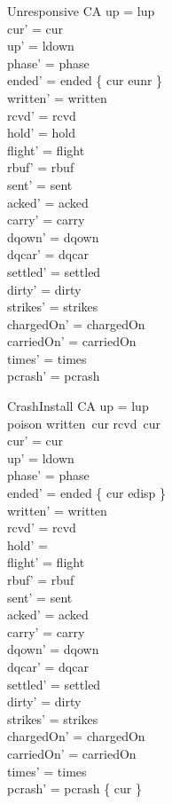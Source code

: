 \documentclass[a4paper,10pt,fleqn]{article}
\begin{document}
\begin{schema}{Unresponsive}
  \Delta CA
\where
  up = lup \\
  cur' = cur \\
  up' = ldown \\
  phase' = phase \\
  ended' = ended \oplus \{ cur \mapsto eunr \} \\
  written' = written \\
  rcvd' = rcvd \\
  hold' = hold \\
  flight' = flight \\
  rbuf' = rbuf \\
  sent' = sent \\
  acked' = acked \\
  carry' = carry \\
  dqown' = dqown \\
  dqcar' = dqcar \\
  settled' = settled \\
  dirty' = dirty \\
  strikes' = strikes \\
  chargedOn' = chargedOn \\
  carriedOn' = carriedOn \\
  times' = times \\
  pcrash' = pcrash
\end{schema}

\begin{schema}{CrashInstall}
  \Delta CA
\where
  up = lup \\
  poison \in written~cur \setminus rcvd~cur \\
  cur' = cur \\
  up' = ldown \\
  phase' = phase \\
  ended' = ended \oplus \{ cur \mapsto edisp \} \\
  written' = written \\
  rcvd' = rcvd \\
  hold' = \emptyset \\
  flight' = flight \\
  rbuf' = rbuf \\
  sent' = sent \\
  acked' = acked \\
  carry' = carry \\
  dqown' = dqown \\
  dqcar' = dqcar \\
  settled' = settled \\
  dirty' = dirty \\
  strikes' = strikes \\
  chargedOn' = chargedOn \\
  carriedOn' = carriedOn \\
  times' = times \\
  pcrash' = pcrash \cup \{ cur \}
\end{schema}
\end{document}
